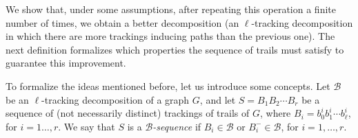 \documentclass[12pt,reqno,a4paper]{amsart}
\newcommand{\B}{\mathcal{B}}
\begin{document}
We show that, under some assumptions, after repeating this
  operation a finite number of times, we obtain a better
  decomposition (an $\ell$-tracking decomposition in which there
  are more trackings inducing paths than the previous one).  
  The next definition formalizes which
  properties the sequence of trails must satisfy to guarantee this
  improvement. 


To formalize the ideas mentioned before, let us introduce some
concepts. Let \(\B\) be an \(\ell\)-tracking
decomposition of a graph \(G\), and let \(S = B_1B_2\cdots B_r\)
be a sequence of (not necessarily distinct) trackings of trails of
$G$, where \(B_i=b_0^ib_1^i\cdots b_\ell^i\), 
for $i=1\ldots,r$. We say that $S$ is a
\emph{\(\mathcal{B}\)-sequence} if  \(B_i\in \mathcal{B}\) or \(B_i^-\in \mathcal{B}\), for \(i=1,\ldots,r\).
\end{document}
